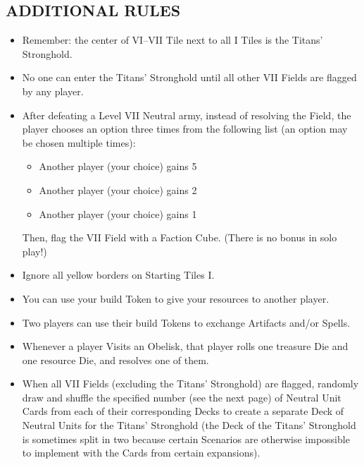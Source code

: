 \begin{multicols*}{2}
\subsection*{\MakeUppercase{Additional Rules}}
\begin{itemize}
  \item Remember: the center of VI--VII Tile next to all I Tiles is the Titans' Stronghold.
  \item No one can enter the Titans' Stronghold until all other VII Fields are flagged by any player.

  \item After defeating a Level VII Neutral army, instead of resolving the Field, the player chooses an option three times from the following list (an option may be chosen multiple times):
    \begin{itemize}
      \item Another player (your choice) gains 5\,
      \item Another player (your choice) gains 2\,
      \item Another player (your choice) gains 1\,
    \end{itemize}
  Then, flag the VII Field with a Faction Cube.
  (There is no bonus in solo play!)

  \item Ignore all yellow borders on Starting Tiles I.
  \item You can use your build Token to give your resources to another player.
  \item Two players can use their build Tokens to exchange Artifacts and/or Spells.

  \item Whenever a player Visits an Obelisk, that player rolls one treasure Die and one resource Die, and resolves one of them.
  \item When all VII Fields (excluding the Titans' Stronghold) are flagged, randomly draw and shuffle the specified number (see the next page) of Neutral Unit Cards from each of their corresponding Decks to create a separate Deck of Neutral Units for the Titans' Stronghold (the Deck of the Titans' Stronghold is sometimes split in two because certain Scenarios are otherwise impossible to implement with the Cards from certain expansions).


\end{itemize}
\end{multicols*}
